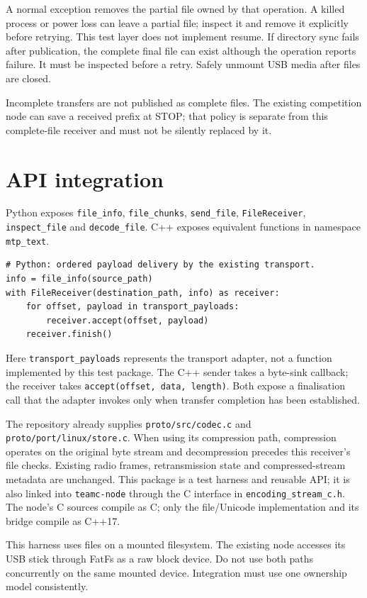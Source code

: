 \documentclass[10pt,a4paper]{article}
\begin{document}
A normal exception removes the partial file owned by that operation. A killed
process or power loss can leave a partial file; inspect it and remove it explicitly
before retrying. This test layer does not implement resume. If directory sync fails
after publication, the complete final file can exist although the operation
reports failure. It must be inspected before a retry. Safely unmount USB media
after files are closed.

Incomplete transfers are not published as complete files. The existing competition
node can save a received prefix at STOP; that policy is separate from this
complete-file receiver and must not be silently replaced by it.

\section{API integration}
Python exposes \texttt{file\_info}, \texttt{file\_chunks}, \texttt{send\_file},
\texttt{FileReceiver}, \texttt{inspect\_file} and \texttt{decode\_file}.
C++ exposes equivalent functions in namespace \texttt{mtp\_text}.
\begin{verbatim}
# Python: ordered payload delivery by the existing transport.
info = file_info(source_path)
with FileReceiver(destination_path, info) as receiver:
    for offset, payload in transport_payloads:
        receiver.accept(offset, payload)
    receiver.finish()
\end{verbatim}
Here \texttt{transport\_payloads} represents the transport adapter, not a function
implemented by this test package. The C++ sender takes a byte-sink callback; the
receiver takes \texttt{accept(offset, data, length)}. Both expose a finalisation
call that the adapter invokes only when transfer completion has been established.

The repository already supplies \texttt{proto/src/codec.c} and
\texttt{proto/port/linux/store.c}. When using its compression path, compression
operates on the original byte stream and decompression precedes this receiver's
file checks. Existing radio frames, retransmission state and compressed-stream
metadata are unchanged. This package is a test harness and reusable API; it is
also linked into \texttt{teamc-node} through the C interface in
\texttt{encoding\_stream\_c.h}. The node's C sources compile as C; only the
file/Unicode implementation and its bridge compile as C++17.

This harness uses files on a mounted filesystem. The existing node accesses its
USB stick through FatFs as a raw block device. Do not use both paths concurrently
on the same mounted device. Integration must use one ownership model consistently.
\end{document}
